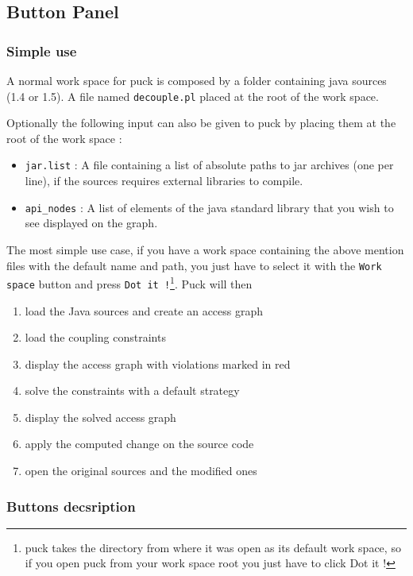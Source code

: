 \documentclass[]{article}
\begin{document}
\subsection{Button Panel}
\subsubsection{Simple use}

A normal work space for puck is composed by a folder containing java sources (1.4 or 1.5).
A file named \verb|decouple.pl| placed at the root of the work space.

Optionally the following input can also be given to puck by placing them at the root of the work space :
\begin{itemize}
\item \verb|jar.list| : A file containing a list of absolute paths to jar archives (one per line), if the sources requires external libraries to compile.
\item \verb|api_nodes| : A list of elements of the java standard library that you wish to see displayed on the graph.
\end{itemize} 

The most simple use case, if you have a work space containing the above mention files with the default name and path, you just have to select it with the
 \verb|Work space| button and press \verb|Dot it !|\footnote{puck takes the directory from where it was open as its default work space, so if you open puck from your work space root you just have to click Dot it !}.
 Puck will then 
 \begin{enumerate}
 	\item load the Java sources and create an access graph
 	\item load the coupling constraints
 	\item display the access graph with violations marked in red
 	\item solve the constraints with a default strategy
 	\item display the solved access graph
 	\item apply the computed change on the source code
 	\item open the original sources and the modified ones 	
 \end{enumerate}

\subsubsection{Buttons decsription}
\end{document}
